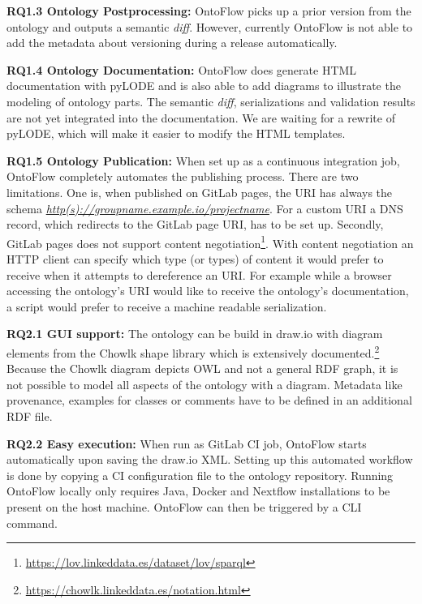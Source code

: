 \documentclass[runningheads]{llncs}
\begin{document}
\noindent\textbf{RQ1.3 Ontology Postprocessing:} OntoFlow picks up a prior version from the ontology and outputs a semantic \textit{diff}. However, currently OntoFlow is not able to add the metadata about versioning during a release automatically.

\noindent\textbf{RQ1.4 Ontology Documentation:} OntoFlow does generate HTML documentation with pyLODE and is also able to add diagrams to illustrate the modeling of ontology parts. The semantic \textit{diff}, serializations and validation results are not yet integrated into the documentation. We are waiting for a rewrite of pyLODE, which will make it easier to modify the HTML templates.

\noindent\textbf{RQ1.5 Ontology Publication:} When set up as a continuous integration job, OntoFlow completely automates the publishing process. There are two limitations. One is, when published on GitLab pages, the URI has always the schema \textit{\url{http(s)://groupname.example.io/projectname}}. For a custom URI a DNS record, which redirects to the GitLab page URI, has to be set up. Secondly, GitLab pages does not support content negotiation\footnote{\url{https://lov.linkeddata.es/dataset/lov/sparql}}. With content negotiation an HTTP client can specify which type (or types) of content it would prefer to receive when it attempts to dereference an URI. For example while a browser accessing the ontology's URI would like to receive the ontology's documentation, a script would prefer to receive a machine readable serialization.

\noindent\textbf{RQ2.1 GUI support:} The ontology can be build in draw.io with diagram elements from the Chowlk shape library which is extensively documented.\footnote{\url{https://chowlk.linkeddata.es/notation.html}} Because the Chowlk diagram depicts OWL and not a general RDF graph, it is not possible to model all aspects of the ontology with a diagram. Metadata like provenance, examples for classes or comments have to be defined in an additional RDF file.

\noindent\textbf{RQ2.2 Easy execution:} When run as GitLab CI job, OntoFlow starts automatically upon saving the draw.io XML. Setting up this automated workflow is done by copying a CI configuration file to the ontology repository. Running OntoFlow locally only requires Java, Docker and Nextflow installations to be present on the host machine. OntoFlow can then be triggered by a CLI command.
\end{document}
